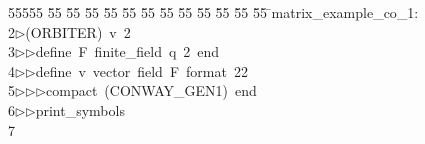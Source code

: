 %
%
\begin{tabbing}
55555 \= 55 \= 55 \= 55 \= 55 \= 55 \= 55 \= 55 \= 55 \= 55 \= 55 \= 55 \= 55 \= \>matrix\_example\_co\_1:\\[0pt]
2\>$\triangleright$\>(ORBITER)\ v\ 2\ \\[0pt]
3\>$\triangleright$\>$\triangleright$\>define\ F\ finite\_field\ q\ 2\ end\ \\[0pt]
4\>$\triangleright$\>$\triangleright$\>define\ v\ vector\ field\ F\ format\ 22\ \\[0pt]
5\>$\triangleright$\>$\triangleright$\>$\triangleright$\>compact\ (CONWAY\_GEN1)\ end\ \\[0pt]
6\>$\triangleright$\>$\triangleright$\>print\_symbols\\[0pt]
7\>\end{tabbing}

